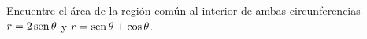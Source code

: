 \item Encuentre el área de la región común al interior de ambas circunferencias $r = 2\operatorname{sen}\theta$ y $r = \operatorname{sen}\theta + \cos\theta$.
